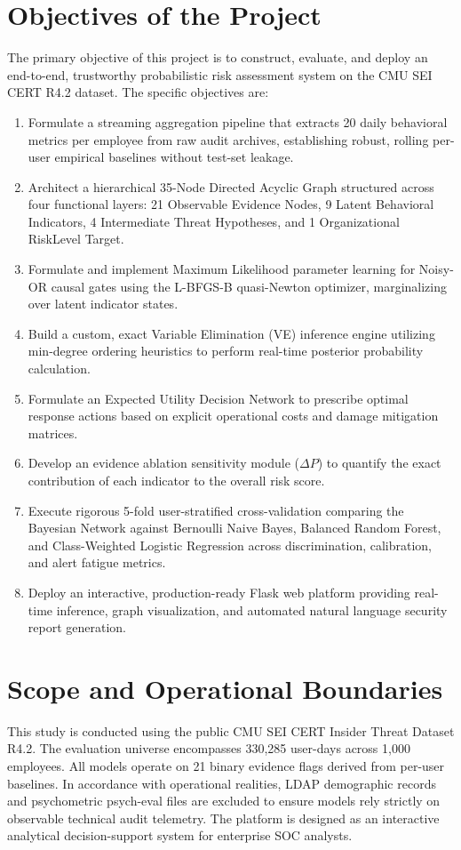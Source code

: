 \documentclass[12pt,a4paper]{report}
\begin{document}
\section{Objectives of the Project}
The primary objective of this project is to construct, evaluate, and deploy an end-to-end, trustworthy probabilistic risk assessment system on the CMU SEI CERT R4.2 dataset. The specific objectives are:
\begin{enumerate}
    \item Formulate a streaming aggregation pipeline that extracts 20 daily behavioral metrics per employee from raw audit archives, establishing robust, rolling per-user empirical baselines without test-set leakage.
    \item Architect a hierarchical 35-Node Directed Acyclic Graph structured across four functional layers: 21 Observable Evidence Nodes, 9 Latent Behavioral Indicators, 4 Intermediate Threat Hypotheses, and 1 Organizational RiskLevel Target.
    \item Formulate and implement Maximum Likelihood parameter learning for Noisy-OR causal gates using the L-BFGS-B quasi-Newton optimizer, marginalizing over latent indicator states.
    \item Build a custom, exact Variable Elimination (VE) inference engine utilizing min-degree ordering heuristics to perform real-time posterior probability calculation.
    \item Formulate an Expected Utility Decision Network to prescribe optimal response actions based on explicit operational costs and damage mitigation matrices.
    \item Develop an evidence ablation sensitivity module ($\Delta P$) to quantify the exact contribution of each indicator to the overall risk score.
    \item Execute rigorous 5-fold user-stratified cross-validation comparing the Bayesian Network against Bernoulli Naive Bayes, Balanced Random Forest, and Class-Weighted Logistic Regression across discrimination, calibration, and alert fatigue metrics.
    \item Deploy an interactive, production-ready Flask web platform providing real-time inference, graph visualization, and automated natural language security report generation.
\end{enumerate}

\section{Scope and Operational Boundaries}
This study is conducted using the public CMU SEI CERT Insider Threat Dataset R4.2. The evaluation universe encompasses 330,285 user-days across 1,000 employees. All models operate on 21 binary evidence flags derived from per-user baselines. In accordance with operational realities, LDAP demographic records and psychometric psych-eval files are excluded to ensure models rely strictly on observable technical audit telemetry. The platform is designed as an interactive analytical decision-support system for enterprise SOC analysts.
\end{document}
